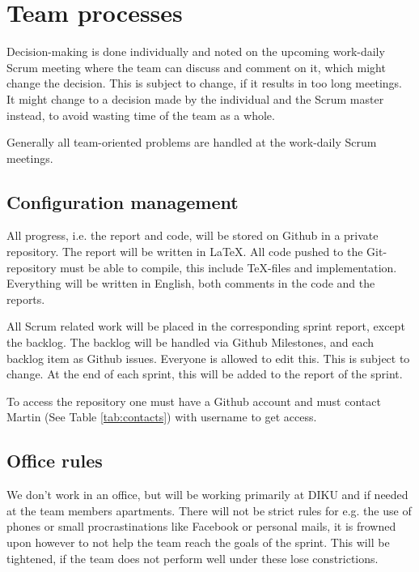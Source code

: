 \section{Team processes}

Decision-making is done individually and noted on the upcoming work-daily Scrum meeting where the team can discuss and comment on it, which might change the decision. This is subject to change, if it results in too long meetings. It might change to a decision made by the individual and the Scrum master instead, to avoid wasting time of the team as a whole.

Generally all team-oriented problems are handled at the work-daily Scrum meetings.

\subsection{Configuration management}
All progress, i.e. the report and code, will be stored on Github in a private repository.
The report will be written in \LaTeX.
All code pushed to the Git-repository must be able to compile, this include \TeX-files and implementation.
Everything will be written in English, both comments in the code and the reports.

All Scrum related work will be placed in the corresponding sprint report, except the backlog. The backlog will be handled via Github Milestones, and each backlog item as Github issues. Everyone is allowed to edit this. This is subject to change. At the end of each sprint, this will be added to the report of the sprint.

To access the repository one must have a Github account and must contact Martin (See Table \ref{tab:contacts}) with username to get access.


\subsection{Office rules}
We don't work in an office, but will be working primarily at DIKU and if needed at the team members apartments. There will not be strict rules for e.g. the use of phones or small procrastinations like Facebook or personal mails, it is frowned upon however to not help the team reach the goals of the sprint. This will be tightened, if the team does not perform well under these lose constrictions.

